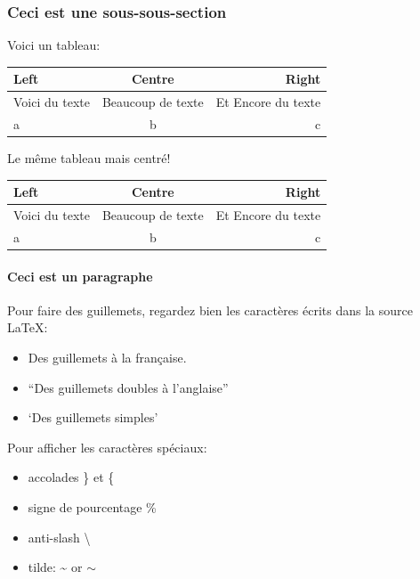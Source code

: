\documentclass[paper=a4, fontsize=11pt]{article}
\begin{document}
\subsubsection{Ceci est une sous-sous-section}

Voici un tableau:\\ %

\begin{tabular}{lcr} %
\toprule
Left & Centre & Right \\
\midrule
Voici du texte & Beaucoup de texte & Et Encore du texte \\
a & b & c \\
\bottomrule
\end{tabular}

\vspace{0.5cm} %

Le même tableau mais centré!

\begin{center}
\begin{tabular}{lcr} %
\toprule
Left & Centre & Right \\
\midrule
Voici du texte & Beaucoup de texte & Et Encore du texte \\
a & b & c \\
\bottomrule
\end{tabular}
\end{center}

\paragraph{Ceci est un paragraphe}
Pour faire des guillemets, regardez bien les caractères écrits dans la source \LaTeX: 
\begin{itemize}
\item \og Des guillemets à la française\fg{}.
\item ``Des guillemets doubles à l'anglaise''
\item `Des guillemets simples'
\end{itemize}

\vspace{0.5cm} 

Pour afficher les caractères spéciaux:
\begin{itemize}
\item accolades \} et \{
\item signe de pourcentage \%
\item anti-slash \textbackslash
\item tilde: \textasciitilde{} or $\sim$ 
\end{itemize}
\end{document}
